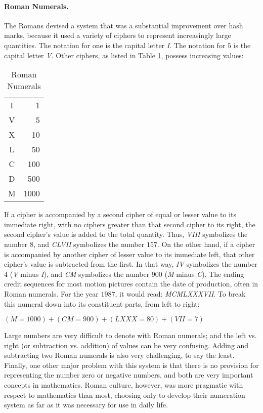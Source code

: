 \paragraph{Roman Numerals.} The Romans devised a system that was a substantial improvement over hash marks, because it used a variety of ciphers to represent increasingly large quantities. The notation for one is the capital letter \emph{I}. The notation for $ 5 $ is the capital letter \emph{V}. Other ciphers, as listed in Table \ref{MF:tab:roman}, possess increasing values:

\begin{table}[H]
  \begin{center}
    \begin{tabular}{ c r } \hline
      I & 1 \\
      V & 5 \\
      X & 10 \\
      L & 50 \\
      C & 100 \\
      D & 500 \\
      M & 1000 \\ \hline
    \end{tabular}
  \end{center}
  \caption{Roman Numerals}
  \label{MF:tab:roman}
\end{table}

If a cipher is accompanied by a second cipher of equal or lesser value to its immediate right, with no ciphers greater than that second cipher to its right, the second cipher's value is added to the total quantity. Thus, \emph{VIII} symbolizes the number $ 8 $, and \emph{CLVII} symbolizes the number $ 157 $. On the other hand, if a cipher is accompanied by another cipher of lesser value to its immediate left, that other cipher's value is subtracted from the first. In that way, \emph{IV} symbolizes the number $ 4 $ (\emph{V} minus \emph{I}), and \emph{CM} symbolizes the number $ 900 $ (\emph{M} minus \emph{C}). The ending credit sequences for most motion pictures contain the date of production, often in Roman numerals. For the year $ 1987 $, it would read: \emph{MCMLXXXVII}. To break this numeral down into its constituent parts, from left to right:

\begin{center}
  $ (M = 1000) + (CM = 900) + (LXXX = 80) + (VII = 7) $
\end{center}

Large numbers are very difficult to denote with Roman numerals; and the left vs. right (or subtraction vs. addition) of values can be very confusing. Adding and subtracting two Roman numerals is also very challenging, to say the least. Finally, one other major problem with this system is that there is no provision for representing the number zero or negative numbers, and both are very important concepts in mathematics. Roman culture, however, was more pragmatic with respect to mathematics than most, choosing only to develop their numeration system as far as it was necessary for use in daily life.

